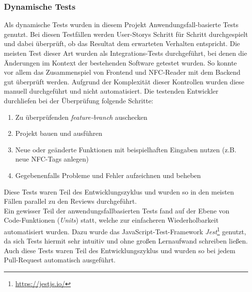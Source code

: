 \documentclass[10pt, a4paper]{article}
\begin{document}
\begin{onehalfspace}
  \subsubsection*{Dynamische Tests}
    Als dynamische Tests wurden in diesem Projekt Anwendungsfall-basierte Tests genutzt.
    Bei diesen Testfällen werden User-Storys Schritt für Schritt \glqq durchgespielt\grqq{} und dabei überprüft, ob das Resultat  dem erwarteten Verhalten entspricht.
    Die meisten Test dieser Art wurden als Integrations-Tests durchgeführt, bei denen die Änderungen im Kontext der bestehenden Software getestet wurden.
    So konnte vor allem das Zusammenspiel von Frontend und NFC-Reader mit dem Backend gut überprüft werden.
    Aufgrund der Komplexität dieser Kontrollen wurden diese manuell durchgeführt und nicht automatisiert.
    Die testenden Entwickler durchliefen bei der Überprüfung folgende Schritte:
    \begin{enumerate}
      \item Zu überprüfenden \textit{feature-branch} auschecken
      \item Projekt bauen und ausführen
      \item Neue oder geänderte Funktionen mit beispielhaften Eingaben nutzen (z.B. neue NFC-Tags anlegen)
      \item Gegebenenfalls Probleme und Fehler aufzeichnen und beheben
    \end{enumerate}
    Diese Tests waren Teil des Entwicklungszyklus und wurden so in den meisten Fällen parallel zu den Reviews durchgeführt.
    \\
    Ein gewisser Teil der anwendungsfallbasierten Tests fand auf der Ebene von Code-Funktionen (\textit{Units}) statt, welche zur einfacheren Wiederholbarkeit automatisiert wurden.
    Dazu wurde das JavaScript-Test-Framework \textit{Jest}\footnote{\raggedright\url{https://jestjs.io/}} genutzt, da sich Tests hiermit sehr intuitiv und ohne großen Lernaufwand schreiben ließen.
    Auch diese Tests waren Teil des Entwicklungszyklus und wurden so bei jedem Pull-Request automatisch ausgeführt.



\end{onehalfspace}
\end{document}
